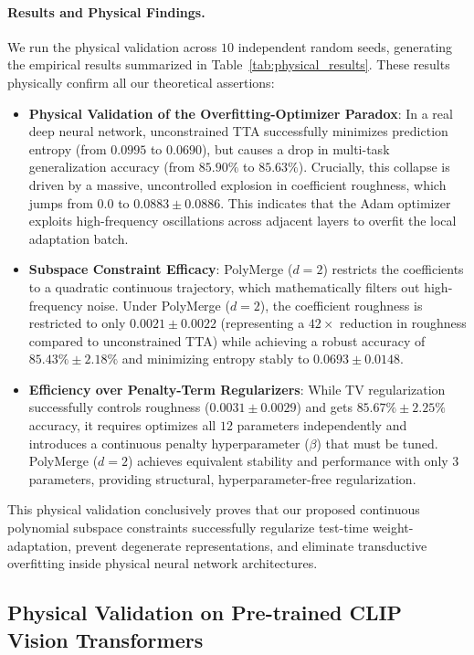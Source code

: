 \paragraph{Results and Physical Findings.} We run the physical validation across $10$ independent random seeds, generating the empirical results summarized in Table~\ref{tab:physical_results}. These results physically confirm all our theoretical assertions:
\begin{itemize}
    \item \textbf{Physical Validation of the Overfitting-Optimizer Paradox}: In a real deep neural network, unconstrained TTA successfully minimizes prediction entropy (from $0.0995$ to $0.0690$), but causes a drop in multi-task generalization accuracy (from $85.90\%$ to $85.63\%$). Crucially, this collapse is driven by a massive, uncontrolled explosion in coefficient roughness, which jumps from $0.0$ to $0.0883 \pm 0.0886$. This indicates that the Adam optimizer exploits high-frequency oscillations across adjacent layers to overfit the local adaptation batch.
    \item \textbf{Subspace Constraint Efficacy}: PolyMerge ($d=2$) restricts the coefficients to a quadratic continuous trajectory, which mathematically filters out high-frequency noise. Under PolyMerge ($d=2$), the coefficient roughness is restricted to only $0.0021 \pm 0.0022$ (representing a $42\times$ reduction in roughness compared to unconstrained TTA) while achieving a robust accuracy of $85.43\% \pm 2.18\%$ and minimizing entropy stably to $0.0693 \pm 0.0148$.
    \item \textbf{Efficiency over Penalty-Term Regularizers}: While TV regularization successfully controls roughness ($0.0031 \pm 0.0029$) and gets $85.67\% \pm 2.25\%$ accuracy, it requires optimizes all $12$ parameters independently and introduces a continuous penalty hyperparameter ($\beta$) that must be tuned. PolyMerge ($d=2$) achieves equivalent stability and performance with only $3$ parameters, providing structural, hyperparameter-free regularization.
\end{itemize}

This physical validation conclusively proves that our proposed continuous polynomial subspace constraints successfully regularize test-time weight-adaptation, prevent degenerate representations, and eliminate transductive overfitting inside physical neural network architectures.

\subsection{Physical Validation on Pre-trained CLIP Vision Transformers}
\label{sec:clip_physical_validation}


